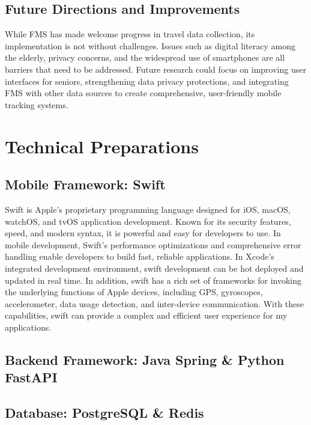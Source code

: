 \documentclass[12pt,two side]{report}
\begin{document}
\section{Future Directions and Improvements}
While FMS has made welcome progress in travel data collection, its implementation is not without challenges. Issues such as digital literacy among the elderly, privacy concerns, and the widespread use of smartphones are all barriers that need to be addressed. Future research could focus on improving user interfaces for seniors, strengthening data privacy protections, and integrating FMS with other data sources to create comprehensive, user-friendly mobile tracking systems.

\chapter{Technical Preparations}
\section{Mobile Framework: Swift}

Swift is Apple's proprietary programming language designed for iOS, macOS, watchOS, and tvOS application development. Known for its security features, speed, and modern syntax, it is powerful and easy for developers to use. In mobile development, Swift's performance optimizations and comprehensive error handling enable developers to build fast, reliable applications. In Xcode's integrated development environment, swift development can be hot deployed and updated in real time. In addition, swift has a rich set of frameworks for invoking the underlying functions of Apple devices, including GPS, gyroscopes, accelerometer, data usage detection, and inter-device communication. With these capabilities, swift can provide a complex and efficient user experience for my applications.

\section{Backend Framework: Java Spring \& Python FastAPI}
\section{Database: PostgreSQL \& Redis}
\end{document}
